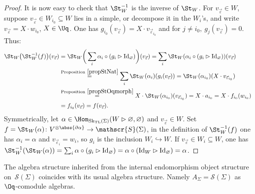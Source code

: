 \begin{proof}
It is now easy to check that $\St_W^{-1}$ is the inverse of $\St_W$. For $v_{\vec{\varepsilon}} \in W$, suppose $v_{\vec{\varepsilon}}\in W_{i_0} \subseteq W$ lies in a simple, or decompose it in the $W_i$'s, and write $v_{\vec{\varepsilon}} = X\cdot w_{i_0}$, $X \in \Uq$. One has $g_{i_0}(v_{\vec{\varepsilon}})= X\cdot v_{\vec{\varepsilon}_{i_0}}$ and for $j\neq {i_0},\ g_j(v_{\vec{\varepsilon}})=0$. Thus:
\begin{align*}
\St_W\big(\St_W^{-1}(f)\big)(v_{\vec{\varepsilon}}) &= \St_W\bigg(\sum_i \alpha_i\circ (g_i \rhd {\rm Id}_\varnothing)\bigg)(v_{\vec{\varepsilon}}) = \sum_i \St_W(\alpha_i\circ (g_i \rhd {\rm Id}_\varnothing))(v_{\vec{\varepsilon}})
\\
&\overset{{\rm Proposition~\ref{propStNat}}}{=} \sum_i \St_W(\alpha_i)(g_i(v_{\vec{\varepsilon}}))
 = \St_W(\alpha_{i_0})(X\cdot v_{\vec{\varepsilon}_{i_0}})
 \\&
\overset{{\rm Proposition~\ref{propStOqmorph}}}{=} X\cdot \St_W(\alpha_{i_0})(v_{\vec{\varepsilon}_{i_0}})= X\cdot a_{i_0}= X \cdot f_{i_0}(w_{i_0})\\
& = f_{i_0}(v_{\vec{\varepsilon}})= f(v_{\vec{\varepsilon}}).
\end{align*}
Symmetrically, let $\alpha \in \Hom_{{\rm Sk}_{{\rm TL}}(\Sigma)}(W \rhd \varnothing,\varnothing)$ and $v_{\vec{\varepsilon}} \in W$. Set $f=\St_W(\alpha)\colon V^{\otimes \abss{\partial \alpha}} \to \mathscr{S}(\Sigma)$, in the definition of $\St_W^{-1}(f)$ one has $\alpha_i = \alpha$ and $v_{\vec{\varepsilon}_i}=w_i$, so $g_i$ is the inclusion $W_i\hookrightarrow W$. If $v_{\vec{\varepsilon}} \in W_i \subseteq W$, one has $\St_W^{-1}(\St_W(\alpha))=\sum_i \alpha\circ (g_i\rhd {\rm Id}_\varnothing) = \alpha\circ ({\rm Id}_W \rhd {\rm Id}_\varnothing) = \alpha$.
\end{proof}

\begin{Proposition}\label{propProdsOnSS}
The algebra structure inherited from the internal endomorphism object structure on~$\mathscr{S}(\Sigma)$ coincides with its usual algebra structure. Namely $A_\Sigma =\mathscr{S}(\Sigma)$ as $\Oq$-comodule algebras.
\end{Proposition}

